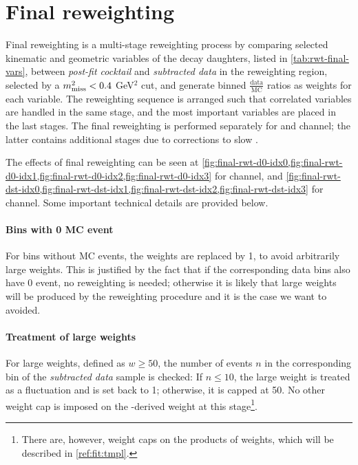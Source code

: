 \section{Final reweighting}
\label{ref:mc-cor:final}

Final reweighting is a multi-stage reweighting process by comparing
selected kinematic and geometric variables of the \B decay daughters,
listed in \cref{tab:rwt-final-vars},
between \emph{post-fit cocktail} and \emph{subtracted data}
in the reweighting region, selected by a $m^2_\text{miss} < 0.4$ GeV$^2$ cut,
and generate binned $\frac{\text{data}}{\text{MC}}$ ratios as weights for each
variable.
The reweighting sequence is arranged such that correlated variables are
handled in the same stage, and the most important variables are placed in the
last stages.
The final reweighting is performed separately for \Dz and \Dstar channel;
the latter contains additional stages due to corrections to slow \pion.

The effects of final reweighting can be seen at
\cref{fig:final-rwt-d0-idx0,fig:final-rwt-d0-idx1,fig:final-rwt-d0-idx2,fig:final-rwt-d0-idx3}
for \Dz channel, and
\cref{fig:final-rwt-dst-idx0,fig:final-rwt-dst-idx1,fig:final-rwt-dst-idx2,fig:final-rwt-dst-idx3}
for \Dstar channel.
Some important technical details are provided below.

\paragraph{Bins with 0 MC event} For bins without MC events,
the weights are replaced by 1, to avoid arbitrarily large weights.
This is justified by the fact that if the corresponding data bins also have
0 event, no reweighting is needed;
otherwise it is likely that large weights will be produced by the reweighting
procedure and it is the case we want to avoided.

\paragraph{Treatment of large weights}
For large weights, defined as $w \geq 50$, the number of events $n$
in the corresponding bin of the \emph{subtracted data} sample is checked:
If $n \leq 10$, the large weight is treated as a fluctuation and is
set back to 1;
otherwise, it is capped at 50.
No other weight cap is imposed on the \jpsi\kaon-derived weight at this
stage\footnote{
    There are, however, weight caps on the products of weights,
    which will be described in
    \cref{ref:fit:tmpl}.
}.

